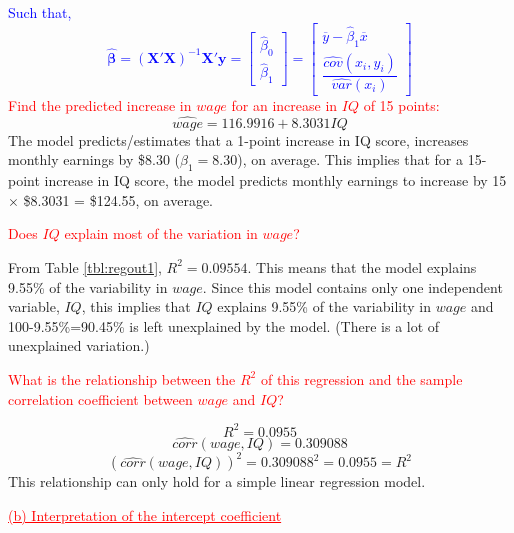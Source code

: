 \documentclass[12pt]{report}
\newenvironment{blueframed}[1][blue]
{\def\FrameCommand{\fboxsep=\FrameSep\fcolorbox{#1}{white}}%
\MakeFramed {\advance\hsize-\width \FrameRestore}}
{\endMakeFramed}
\begin{document}
\begin{blueframed}
	\noindent \textcolor{blue}{Such that, $$\widehat{\boldsymbol{\beta}} =(\textbf{X}'\textbf{X})^{-1}\textbf{X}'\textbf{y}=\begin{bmatrix}
		\hat{\beta}_0 \\
		\hat{\beta}_1 
		\end{bmatrix} = \begin{bmatrix}
		\overline{y} - \hat{\beta}_1 \overline{x} \\
		\dfrac{\widehat{cov}(x_i , y_i)}{\widehat{var}(x_i)}
		\end{bmatrix}$$
	}
\end{blueframed}
\noindent \textcolor{red}{Find the predicted increase in $wage$ for an increase in $IQ$ of 15 points:}
$$\widehat{wage} = 116.9916+8.3031IQ$$
\noindent The model predicts/estimates that a 1-point increase in IQ score, increases monthly earnings by \$8.30 ($\hat{\beta}_1 = 8.30$), on average.
\noindent This implies that for a 15-point increase in IQ score, the model predicts monthly earnings to increase by 15 $\times$ \$8.3031 = \$124.55, on average.

\noindent \textcolor{red}{Does $IQ$ explain most of the variation in $wage$?}

\noindent From Table \ref{tbl:regout1}, $R^2 = 0.09554$. This means that the model explains 9.55\% of the variability in $wage$. Since this model contains only one independent variable, $IQ$, this implies that $IQ$ explains 9.55\% of the variability in $wage$ and 100-9.55\%=90.45\% is left unexplained by the model. (There is a lot of unexplained variation.)

\noindent \textcolor{red}{What is the relationship between the $R^2$ of this regression and the sample correlation coefficient between $wage$ and $IQ$?}
\begin{figure}[H]
	\centering
\end{figure}
\vspace{-\baselineskip} 
$$R^2 = 0.0955$$
$$\widehat{corr}(wage,IQ) = 0.309088$$
$$(\widehat{corr}(wage,IQ))^2 = 0.309088^2 = 0.0955 = R^2$$
\noindent This relationship can only hold for a simple linear regression model.

\noindent \textcolor{red}{\underline{(b) Interpretation of the intercept coefficient}}
\end{document}
